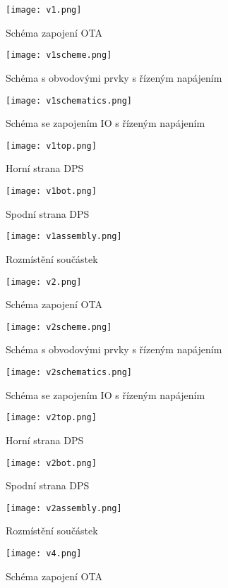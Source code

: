 \begin{figure}[h]
\centering
\texttt{[image: v1.png]}
\caption[]{Schéma zapojení OTA \label{s:V1}}
\end{figure}
\begin{figure}[h]
\centering
\texttt{[image: v1scheme.png]}
\caption[]{Schéma s obvodovými prvky s řízeným napájením}
\end{figure}
\begin{figure}[h]
\centering
\texttt{[image: v1schematics.png]}
\caption[]{Schéma se zapojením IO s řízeným napájením}
\end{figure}
\begin{figure}[h]
\centering
\texttt{[image: v1top.png]}
\caption[]{Horní strana DPS}
\end{figure}
\begin{figure}[h]
\centering
\texttt{[image: v1bot.png]}
\caption[]{Spodní strana DPS}
\end{figure}
\begin{figure}[h]
\centering
\texttt{[image: v1assembly.png]}
\caption[]{Rozmístění součástek}
\end{figure}
\begin{figure}[h]
\centering
\texttt{[image: v2.png]}
\caption[]{Schéma zapojení OTA}
\end{figure}
\begin{figure}[h]
\centering
\texttt{[image: v2scheme.png]}
\caption[]{Schéma s obvodovými prvky s řízeným napájením}
\end{figure}
\begin{figure}[h]
\centering
\texttt{[image: v2schematics.png]}
\caption[]{Schéma se zapojením IO s řízeným napájením}
\end{figure}
\begin{figure}[h]
\centering
\texttt{[image: v2top.png]}
\caption[]{Horní strana DPS}
\end{figure}
\begin{figure}[h]
\centering
\texttt{[image: v2bot.png]}
\caption[]{Spodní strana DPS}
\end{figure}
\begin{figure}[h]
\centering
\texttt{[image: v2assembly.png]}
\caption[]{Rozmístění součástek}
\end{figure}
\begin{figure}[h]
\centering
\texttt{[image: v4.png]}
\caption[]{Schéma zapojení OTA \label{s:V2}}
\end{figure}
